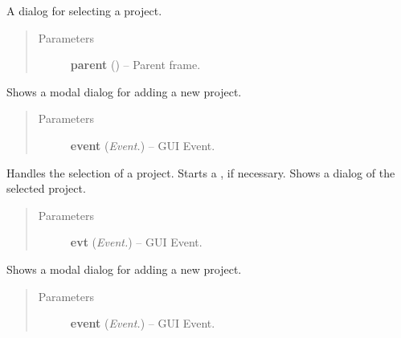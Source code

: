 \documentclass[letterpaper,10pt,english]{sphinxmanual}
\begin{document}
\begin{fulllineitems}
\label{api:wos.ProjectSelectDialog}
A dialog for selecting a project.
\begin{quote}\begin{description}
\item[{Parameters}] \leavevmode
\textbf{parent} () -- Parent frame.

\end{description}\end{quote}

\begin{fulllineitems}
\label{api:wos.ProjectSelectDialog.AddEvent}
Shows a modal dialog for adding a new project.
\begin{quote}\begin{description}
\item[{Parameters}] \leavevmode
\textbf{event} (\emph{Event.}) -- GUI Event.

\end{description}\end{quote}

\end{fulllineitems}


\begin{fulllineitems}
\label{api:wos.ProjectSelectDialog.DelEvent}
Handles the selection of a project.
Starts a {\hyperref[api:wos.CURRENT_PROJECT]{}}, if necessary.
Shows a dialog of the selected project.
\begin{quote}\begin{description}
\item[{Parameters}] \leavevmode
\textbf{evt} (\emph{Event.}) -- GUI Event.

\end{description}\end{quote}

\end{fulllineitems}


\begin{fulllineitems}
\label{api:wos.ProjectSelectDialog.EditEvent}
Shows a modal dialog for adding a new project.
\begin{quote}\begin{description}
\item[{Parameters}] \leavevmode
\textbf{event} (\emph{Event.}) -- GUI Event.


\end{description}
\end{quote}
\end{fulllineitems}
\end{fulllineitems}
\end{document}

